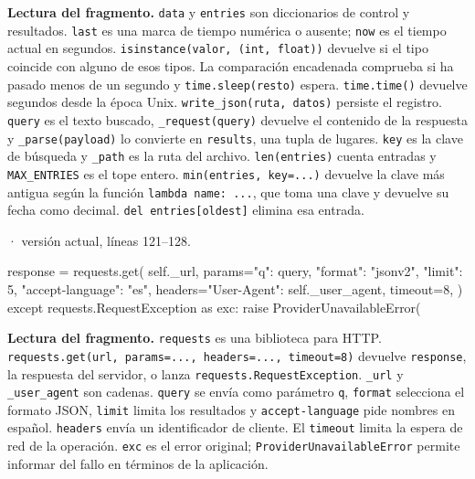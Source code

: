 \documentclass[11pt,a4paper]{article}
\begin{document}
\textbf{Lectura del fragmento.} \texttt{data} y \texttt{entries} son diccionarios de control y resultados. \texttt{last} es una marca de tiempo numérica o ausente; \texttt{now} es el tiempo actual en segundos. \texttt{isinstance(valor, (int, float))} devuelve si el tipo coincide con alguno de esos tipos. La comparación encadenada comprueba si ha pasado menos de un segundo y \texttt{time.sleep(resto)} espera. \texttt{time.time()} devuelve segundos desde la época Unix. \texttt{write\_json(ruta, datos)} persiste el registro. \texttt{query} es el texto buscado, \texttt{\_request(query)} devuelve el contenido de la respuesta y \texttt{\_parse(payload)} lo convierte en \texttt{results}, una tupla de lugares. \texttt{key} es la clave de búsqueda y \texttt{\_path} es la ruta del archivo. \texttt{len(entries)} cuenta entradas y \texttt{MAX\_ENTRIES} es el tope entero. \texttt{min(entries, key=...)} devuelve la clave más antigua según la función \texttt{lambda name: ...}, que toma una clave y devuelve su fecha como decimal. \texttt{del entries[oldest]} elimina esa entrada.


\smallskip
{\footnotesize\texttt{} · versión actual, líneas 121--128.}\par
\begin{Codigo}[firstnumber=121]
            response = requests.get(
                self._url,
                params={"q": query, "format": "jsonv2", "limit": 5, "accept-language": "es"},
                headers={"User-Agent": self._user_agent},
                timeout=8,
            )
        except requests.RequestException as exc:
            raise ProviderUnavailableError(
\end{Codigo}

\textbf{Lectura del fragmento.} \texttt{requests} es una biblioteca para HTTP. \texttt{requests.get(url, params=..., headers=..., timeout=8)} devuelve \texttt{response}, la respuesta del servidor, o lanza \texttt{requests.RequestException}. \texttt{\_url} y \texttt{\_user\_agent} son cadenas. \texttt{query} se envía como parámetro \texttt{q}, \texttt{format} selecciona el formato JSON, \texttt{limit} limita los resultados y \texttt{accept-language} pide nombres en español. \texttt{headers} envía un identificador de cliente. El \texttt{timeout} limita la espera de red de la operación. \texttt{exc} es el error original; \texttt{ProviderUnavailableError} permite informar del fallo en términos de la aplicación.
\end{document}
